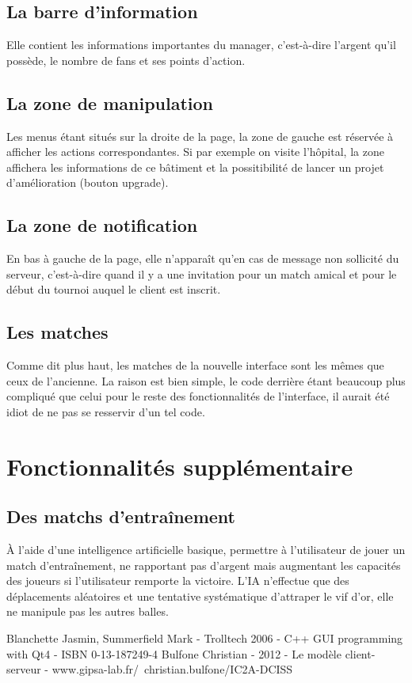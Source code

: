 \documentclass[a4paper,titlepage]{scrreprt}
\begin{document}
\subsection{La barre d'information}
Elle contient les informations importantes du manager, c'est-à-dire l'argent qu'il possède, le nombre de fans et ses points d'action.
\subsection{La zone de manipulation}
Les menus étant situés sur la droite de la page, la zone de gauche est réservée à afficher les actions correspondantes. Si par exemple on visite l'hôpital, la zone affichera les informations de ce bâtiment et la possitibilité de lancer un projet d'amélioration (bouton upgrade).
\subsection{La zone de notification}
En bas à gauche de la page, elle n'apparaît qu'en cas de message non sollicité du serveur, c'est-à-dire quand il y a une invitation pour un match amical et pour le début du tournoi auquel le client est inscrit.
\subsection{Les matches}
Comme dit plus haut, les matches de la nouvelle interface sont les mêmes que ceux de l'ancienne. La raison est bien simple, le code derrière étant beaucoup plus compliqué que celui pour le reste des fonctionnalités de l'interface, il aurait été idiot de ne pas se resservir d'un tel code.

\section{Fonctionnalités supplémentaire}
  \subsection{Des matchs d’entraînement}
    À l'aide d'une intelligence artificielle basique, permettre à l'utilisateur
    de jouer un match d'entraînement, ne rapportant pas d'argent mais
    augmentant les capacités des joueurs si l'utilisateur remporte la victoire.
    L'IA n'effectue que des déplacements aléatoires et une tentative systématique d'attraper le vif d'or,
    elle ne manipule pas les autres balles.
    
  


\begin{thebibliography}{9}
 Blanchette Jasmin, Summerfield Mark - Trolltech 2006 - C++ GUI programming with Qt4 - ISBN 0-13-187249-4
 Bulfone Christian - 2012 - Le modèle client-serveur - www.gipsa-lab.fr/~christian.bulfone/IC2A-DCISS
\end{thebibliography}
\printindex
\end{document}
